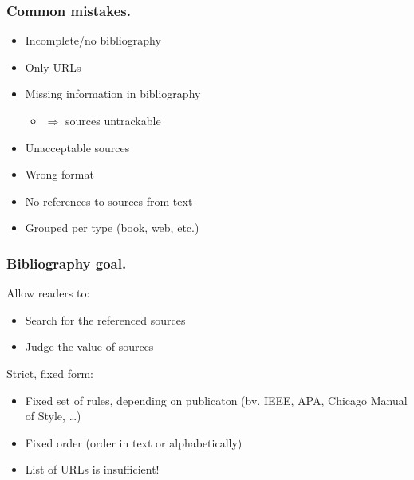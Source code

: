\documentclass[aspectratio=169]{beamer}
\begin{document}
\begin{frame}
    \frametitle{Common mistakes.}

    \begin{itemize}
        \item Incomplete/no bibliography
        \item Only URLs
        \item Missing information in bibliography
              \begin{itemize}
                  \item \(\Rightarrow\) sources untrackable
              \end{itemize}
        \item Unacceptable sources
        \item Wrong format
        \item No references to sources from text
        \item Grouped per type (book, web, etc.)
    \end{itemize}
\end{frame}


\begin{frame}[plain]
    \frametitle{Bibliography goal.}

    Allow readers to:

    \begin{itemize}
        \item Search for the referenced sources
        \item Judge the value of sources
    \end{itemize}

    {\pause}

    Strict, fixed form:

    \begin{itemize}
        \item Fixed set of rules, depending on publicaton (bv. IEEE, APA, Chicago Manual of Style, \ldots)
        \item Fixed order (order in text or alphabetically)
        \item List of URLs is insufficient!
    \end{itemize}

    {\pause}

\end{frame}
\end{document}
